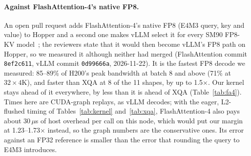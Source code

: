 \documentclass[11pt]{article}
\begin{document}
\paragraph{Against FlashAttention-4's native FP8.} An open pull request adds FlashAttention-4's native FP8 (E4M3 query, key and value) to Hopper and a second one makes vLLM select it for every SM90 FP8-KV model~\citep{fa206,vllm63139}; the reviewers state that it would then become vLLM's FP8 path on Hopper, so we measured it although neither had merged (FlashAttention commit \texttt{8ef2c611}, vLLM commit \texttt{0d99666a}, 2026-11-22). It is the fastest FP8 decode we measured: 85--89\% of H200's peak bandwidth at batch 8 and above (71\% at $32 \times 4$K), and faster than XQA at 8 of the 11 shapes, by up to 1.5$\times$. Our kernel stays ahead of it everywhere, by less than it is ahead of XQA (Table~\ref{tab:fa4}). Times here are CUDA-graph replays, as vLLM decodes; with the eager, L2-flushed timing of Tables~\ref{tab:kernel} and~\ref{tab:xqa}, FlashAttention-4 also pays about 30\,$\mu$s of host overhead per call on this node, which would put our margin at 1.23--1.73$\times$ instead, so the graph numbers are the conservative ones. Its error against an FP32 reference is smaller than the error that rounding the query to E4M3 introduces.
\end{document}
